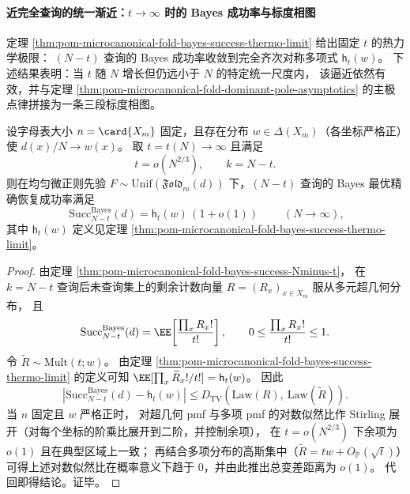 \paragraph{近完全查询的统一渐近：\texorpdfstring{$t\to\infty$}{t->infty} 时的 Bayes 成功率与标度相图}
定理 \ref{thm:pom-microcanonical-fold-bayes-success-thermo-limit} 给出固定 \(t\) 的热力学极限：
\((N-t)\) 查询的 Bayes 成功率收敛到完全齐次对称多项式 \(\mathsf{h}_t(w)\)。
下述结果表明：当 \(t\) 随 \(N\) 增长但仍远小于 \(N\) 的特定统一尺度内，
该逼近依然有效，并与定理 \ref{thm:pom-microcanonical-fold-dominant-pole-asymptotics} 的主极点律拼接为一条三段标度相图。

\begin{theorem}[近完全查询的统一热力学逼近]\label{thm:pom-microcanonical-fold-bayes-success-near-complete-uniform}
设字母表大小 \(n=\card{X_m}\) 固定，且存在分布 \(w\in\Delta(X_m)\)（各坐标严格正）使 \(d(x)/N\to w(x)\)。
取 \(t=t(N)\to\infty\) 且满足
\[
t=o(N^{2/3}),
\qquad
k=N-t.
\]
则在均匀微正则先验 \(F\sim\mathrm{Unif}(\mathfrak{Fold}_m(d))\) 下，\((N-t)\) 查询的 Bayes 最优精确恢复成功率满足
\[
\boxed{\;
\mathrm{Succ}^{\mathrm{Bayes}}_{N-t}(d)
=\mathsf{h}_t(w)\,(1+o(1))\;}
\qquad(N\to\infty),
\]
其中 \(\mathsf{h}_t(w)\) 定义见定理 \ref{thm:pom-microcanonical-fold-bayes-success-thermo-limit}。
\end{theorem}
\begin{proof}
由定理 \ref{thm:pom-microcanonical-fold-bayes-success-Nminus-t}，
在 \(k=N-t\) 查询后未查询集上的剩余计数向量 \(R=(R_x)_{x\in X_m}\) 服从多元超几何分布，
且
\[
\mathrm{Succ}^{\mathrm{Bayes}}_{N-t}(d)=\EE\!\left[\frac{\prod_x R_x!}{t!}\right],
\qquad
0\le \frac{\prod_x R_x!}{t!}\le 1.
\]
令 \(\widetilde R\sim\mathrm{Mult}(t;w)\)。
由定理 \ref{thm:pom-microcanonical-fold-bayes-success-thermo-limit} 的定义可知
\(
\EE[\prod_x \widetilde R_x!/t!]=\mathsf{h}_t(w)
\)。
因此
\[
\left|\mathrm{Succ}^{\mathrm{Bayes}}_{N-t}(d)-\mathsf{h}_t(w)\right|
\le D_{\mathrm{TV}}\!\left(\mathrm{Law}(R),\ \mathrm{Law}(\widetilde R)\right).
\]
当 \(n\) 固定且 \(w\) 严格正时，
对超几何 pmf 与多项 pmf 的对数似然比作 Stirling 展开（对每个坐标的阶乘比展开到二阶，并控制余项），
在 \(t=o(N^{2/3})\) 下余项为 \(o(1)\) 且在典型区域上一致；
再结合多项分布的高斯集中（\(\widetilde R=tw+O_{\mathbb{P}}(\sqrt t)\)）可得上述对数似然比在概率意义下趋于 \(0\)，并由此推出总变差距离为 \(o(1)\)。
代回即得结论。证毕。
\end{proof}

